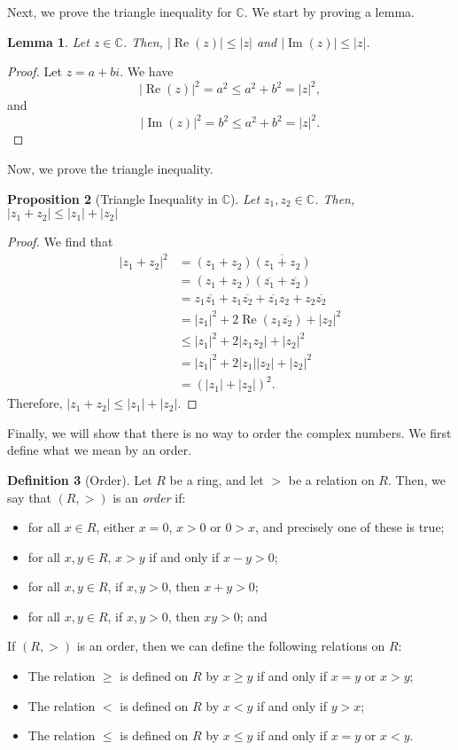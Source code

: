 \documentclass[a4paper, openany]{memoir}
\theoremstyle{definition}
\newtheorem{definition}{Definition}[section]
\theoremstyle{plain}
\newtheorem{lemma}[definition]{Lemma}
\newtheorem{proposition}[definition]{Proposition}
\begin{document}
Next, we prove the triangle inequality for $\mathbb{C}$. We start by proving a lemma.
\begin{lemma}
Let $z \in \mathbb{C}$. Then, $|\operatorname{Re}(z)| \leqslant |z|$ and $|\operatorname{Im}(z)| \leqslant |z|$.
\end{lemma}
\begin{proof}
Let $z = a + bi$. We have
\[|\operatorname{Re}(z)|^2 = a^2 \leqslant a^2 + b^2 = |z|^2,\]
and
\[|\operatorname{Im}(z)|^2 = b^2 \leqslant a^2 + b^2 = |z|^2.\]
\end{proof}
\noindent Now, we prove the triangle inequality.
\begin{proposition}[Triangle Inequality in $\mathbb{C}$]
Let $z_1, z_2 \in \mathbb{C}$. Then, $|z_1 + z_2| \leqslant |z_1| + |z_2|$
\end{proposition}
\begin{proof}
We find that
\begin{align*}
    |z_1 + z_2|^2 &= (z_1 + z_2)\overline{(z_1 + z_2)} \\
    &= (z_1 + z_2)(\overline{z_1} + \overline{z_2}) \\
    &= z_1 \overline{z_1} + z_1 \overline{z_2} + \overline{z_1} z_2 + z_2 \overline{z_2} \\
    &= |z_1|^2 + 2\operatorname{Re}(z_1 \overline{z_2}) + |z_2|^2 \\
    &\leqslant |z_1|^2 + 2|z_1z_2| + |z_2|^2 \\
    &= |z_1|^2 + 2|z_1| |z_2| + |z_2|^2 \\
    &= (|z_1| + |z_2|)^2.
\end{align*}
Therefore, $|z_1 + z_2| \leqslant |z_1| + |z_2|$.
\end{proof}
Finally, we will show that there is no way to order the complex numbers. We first define what we mean by an order.
\begin{definition}[Order]
Let $R$ be a ring, and let $>$ be a relation on $R$. Then, we say that $(R, >)$ is an \emph{order} if:
\begin{itemize}
    \item for all $x \in R$, either $x = 0$, $x > 0$ or $0 > x$, and precisely one of these is true;
    \item for all $x, y \in R$, $x > y$ if and only if $x - y > 0$;
    \item for all $x, y \in R$, if $x, y > 0$, then $x + y > 0$;
    \item for all $x, y \in R$, if $x, y > 0$, then $xy > 0$; and
\end{itemize}
If $(R, >)$ is an order, then we can define the following relations on $R$:
\begin{itemize}
    \item The relation $\geqslant$ is defined on $R$ by $x \geqslant y$ if and only if $x = y$ or $x > y$;
    \item The relation $<$ is defined on $R$ by $x < y$ if and only if $y > x$;
    \item The relation $\leqslant$ is defined on $R$ by $x \leqslant y$ if and only if $x = y$ or $x < y$.
\end{itemize}
\end{definition}
\end{document}
